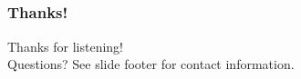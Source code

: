 \documentclass[t]{beamer}
\begin{document}




\subsection{}

\begin{frame}
	\frametitle{Thanks!}
		\begin{center}
			\vfill
			Thanks for listening!\\
			\vfill
			Questions?
			\vfill
			See slide footer for contact information.
			\vfill
		\end{center}
\end{frame}
\end{document}
